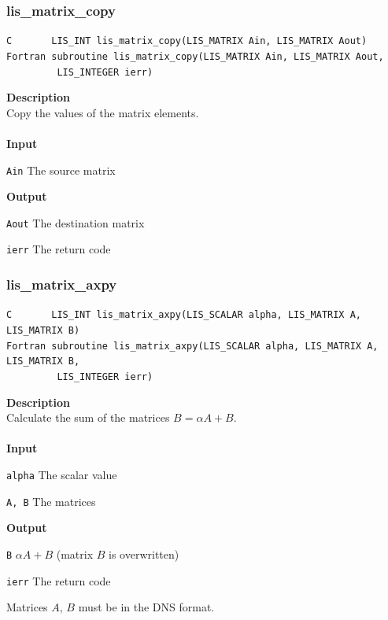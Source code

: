 \documentclass[a4paper]{article}
\newcommand{\namelistlabel}[1]{\mbox{#1}\hfill}
\newenvironment{namelist}[1]{%
\begin{list}{}
  {\let\makelabel\namelistlabel
  \settowidth{\labelwidth}{#1}
  \setlength{\leftmargin}{1.1\labelwidth}}
  }{%
\end{list}}
\begin{document}
\subsubsection{lis\_matrix\_copy}
\begin{screen}
\verb|C       LIS_INT lis_matrix_copy(LIS_MATRIX Ain, LIS_MATRIX Aout)|
\verb|Fortran subroutine lis_matrix_copy(LIS_MATRIX Ain, LIS_MATRIX Aout,|\\
\verb|         LIS_INTEGER ierr) |
\end{screen}
{\bf Description}\\
\indent
Copy the values of the matrix elements.
\\ \\
\noindent
{\bf Input}
\begin{namelist}{XXXXXXXXXXXXXXXXXXXX}
\item[\tt Ain] The source matrix
\end{namelist}
{\bf Output}
\begin{namelist}{XXXXXXXXXXXXXXXXXXXX}
\item[\tt Aout] The destination matrix
\item[\tt ierr] The return code
\end{namelist}

\subsubsection{lis\_matrix\_axpy}
\begin{screen}
\verb|C       LIS_INT lis_matrix_axpy(LIS_SCALAR alpha, LIS_MATRIX A, LIS_MATRIX B)|\\
\verb|Fortran subroutine lis_matrix_axpy(LIS_SCALAR alpha, LIS_MATRIX A, LIS_MATRIX B,|\\
\verb|         LIS_INTEGER ierr) |
\end{screen}
{\bf Description}\\
\indent
Calculate the sum of the matrices $B = \alpha A + B$.
\\ \\
\noindent
{\bf Input}
\begin{namelist}{XXXXXXXXXXXXXXXXXXXX}
\item[\tt alpha] The scalar value
\item[\tt A, B] The matrices
\end{namelist}
{\bf Output}
\begin{namelist}{XXXXXXXXXXXXXXXXXXXX}
\item[\tt B] $\alpha A + B$ (matrix $B$ is overwritten)
\item[\tt ierr] The return code
\end{namelist}
\indent
Matrices $A$, $B$ must be in the DNS format.
\end{document}
